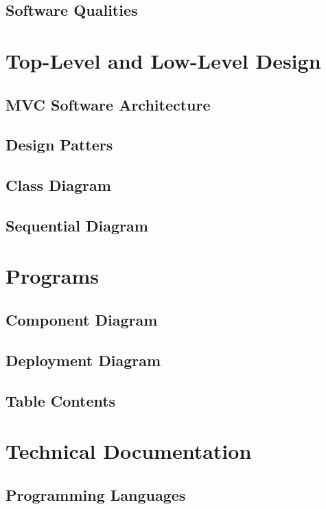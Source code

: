 \documentclass{article}
\begin{document}
\subsection{Software Qualities}

\section{Top-Level and Low-Level Design}
\subsection{MVC Software Architecture}

\subsection{Design Patters}

\subsection{Class Diagram}

\subsection{Sequential Diagram} %

\section{Programs}

\subsection{Component Diagram}

\subsection{Deployment Diagram}

\subsection{Table Contents}

\section{Technical Documentation}
\subsection{Programming Languages}
\end{document}
